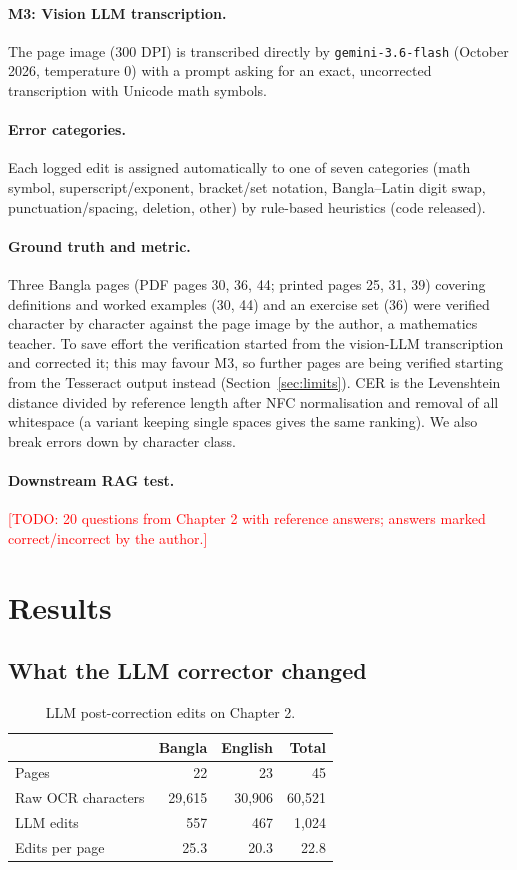 \documentclass[11pt]{article}
\newcommand{\todo}[1]{\textcolor{red}{[TODO: #1]}}
\begin{document}
\paragraph{M3: Vision LLM transcription.} The page image (300 DPI) is
transcribed directly by \texttt{gemini-3.6-flash} (October 2026,
temperature 0) with a prompt asking for an exact, uncorrected transcription
with Unicode math symbols.
\paragraph{Error categories.} Each logged edit is assigned automatically to one
of seven categories (math symbol, superscript/exponent, bracket/set notation,
Bangla--Latin digit swap, punctuation/spacing, deletion, other) by
rule-based heuristics (code released).
\paragraph{Ground truth and metric.} Three Bangla pages (PDF pages 30, 36,
44; printed pages 25, 31, 39) covering definitions and worked examples (30,
44) and an exercise set (36) were verified character by character against
the page image by the author, a mathematics teacher. To save effort the
verification started from the vision-LLM transcription and corrected it;
this may favour M3, so further pages are being verified starting from the
Tesseract output instead (Section~\ref{sec:limits}). CER is the Levenshtein
distance divided by reference length after NFC normalisation and removal of
all whitespace (a variant keeping single spaces gives the same ranking).
We also break errors down by character class.
\paragraph{Downstream RAG test.} \todo{20 questions from Chapter 2 with
reference answers; answers marked correct/incorrect by the author.}

\section{Results}
\subsection{What the LLM corrector changed}

\begin{table}[h]
\centering
\begin{tabular}{lrrr}
\toprule
 & Bangla & English & Total \\
\midrule
Pages & 22 & 23 & 45 \\
Raw OCR characters & 29{,}615 & 30{,}906 & 60{,}521 \\
LLM edits & 557 & 467 & 1{,}024 \\
Edits per page & 25.3 & 20.3 & 22.8 \\
\bottomrule
\end{tabular}
\caption{LLM post-correction edits on Chapter 2.}
\label{tab:edits}
\end{table}
\end{document}
